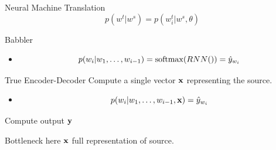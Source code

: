 \documentclass{beamer}
\begin{document}
\begin{frame}{Neural Machine Translation}
  \[ p(w^t | w^s) = p(w^t_i | w^s, \theta)  \] 
\end{frame}


\begin{frame}{Babbler}
  \begin{itemize}
  \item \[ p(w_i | w_1, \ldots, w_{i-1}) = \softmax(RNN()) = \hat{y}_{w_i}   \] 
  \end{itemize}
\end{frame}

\begin{frame}{True Encoder-Decoder}
  Compute a single vector $\mathbf{x}$ representing 
  the source. 
  
  \begin{itemize}
  \item \[ p(w_i | w_1, \ldots, w_{i-1}, \mathbf{x}) = \hat{y}_{w_i}   \] 
  \end{itemize}

  Compute output  $\mathbf{y}$  
\end{frame}


\begin{frame}
  Bottleneck here $\mathbf{x}$ full representation of source.  
\end{frame}






\end{document}
